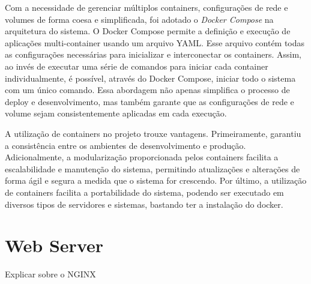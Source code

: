 Com a necessidade de gerenciar múltiplos containers, configurações de rede e volumes de forma coesa e simplificada, foi adotado o \textit{Docker Compose} na arquitetura do sistema. O Docker Compose permite a definição e execução de aplicações multi-container usando um arquivo YAML. Esse arquivo contém todas as configurações necessárias para inicializar e interconectar os containers. Assim, ao invés de executar uma série de comandos para iniciar cada container individualmente, é possível, através do Docker Compose, iniciar todo o sistema com um único comando. Essa abordagem não apenas simplifica o processo de deploy e desenvolvimento, mas também garante que as configurações de rede e volume sejam consistentemente aplicadas em cada execução.

A utilização de containers no projeto trouxe vantagens. Primeiramente, garantiu a consistência entre os ambientes de desenvolvimento e produção. Adicionalmente, a modularização proporcionada pelos containers facilita a escalabilidade e manutenção do sistema, permitindo atualizações e alterações de forma ágil e segura a medida que o sistema for crescendo. Por último, a utilização de containers facilita a portabilidade do sistema, podendo ser executado em diversos tipos de servidores e sistemas, bastando ter a instalação do docker.


\section{Web Server}\label{sec:webserver}
Explicar sobre o NGINX